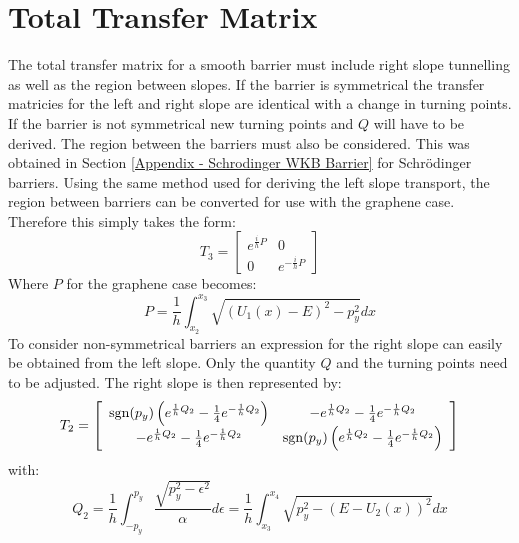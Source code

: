 	\section{Total Transfer Matrix}
	\label{WKB Potential Barrier - Total Transfer Matrix}
		The total transfer matrix for a smooth barrier must include right slope tunnelling as well as the region between slopes. If the barrier is symmetrical the transfer matricies for the left and right slope are identical with a change in turning points. If the barrier is not symmetrical new turning points and $Q$ will have to be derived. The region between the barriers must also be considered. This was obtained in Section \ref{Appendix - Schrodinger WKB Barrier} for Schr\"{o}dinger barriers. Using the same method used for deriving the left slope transport, the region between barriers can be converted for use with the graphene case. Therefore this simply takes the form:
		\begin{equation}
			T_{3}=\left[\begin{array}{cc}
				e^{\frac{i}{h}P}&0\\
				0&e^{-\frac{i}{h}P}
			\end{array}\right]
		\end{equation}
		Where $P$ for the graphene case becomes:
		\begin{equation}
			P=\frac{1}{h}\int_{x_{2}}^{x_{3}}\sqrt{\left(U_{1}\left(x\right)-E\right)^2-p_{y}^{2}}dx
		\end{equation}
		To consider non-symmetrical barriers an expression for the right slope can easily be obtained from the left slope. Only the quantity $Q$ and the turning points need to be adjusted. The right slope is then represented by:
		\begin{equation}
			T_{2}=\left[\begin{array}{cc}
				\operatorname{sgn}(p_{y})\left(e^{\frac{1}{h}Q_{2}}-\frac{1}{4}e^{-\frac{1}{h}Q_{2}}\right)	&	-e^{\frac{1}{h}Q_{2}}-\frac{1}{4}e^{-\frac{1}{h}Q_{2}}\\
				-e^{\frac{1}{h}Q_{2}}-\frac{1}{4}e^{-\frac{1}{h}Q_{2}}	&	\operatorname{sgn}(p_{y})\left(e^{\frac{1}{h}Q_{2}}-\frac{1}{4}e^{-\frac{1}{h}Q_{2}}\right)
			\end{array}\right]
		\end{equation}
		with:
		\begin{equation}
			Q_{2}=\frac{1}{h}\int^{p_{y}}_{-p_{y}}\frac{\sqrt{p_{y}^{2}-\epsilon^{2}}}{\alpha}d\epsilon=\frac{1}{h}\int^{x_{4}}_{x_{3}}\sqrt{p_{y}^{2}-\left(E-U_{2}\left(x\right)\right)^{2}}dx
		\end{equation}
